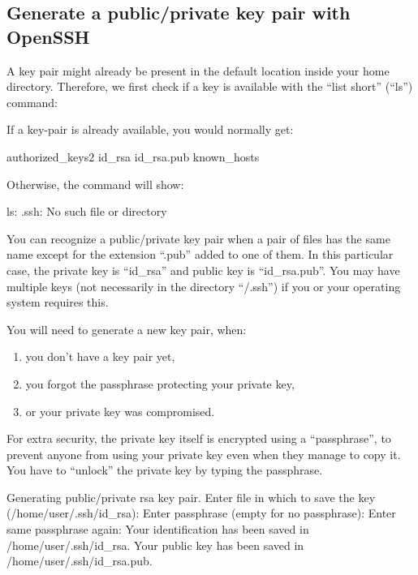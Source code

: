   \subsection{Generate a public/private key pair with OpenSSH}
  \label{sec:generate-key-pair-with-openssh}

  A key pair might already be present in the default location inside your home
  directory. Therefore, we first check if a key is available with the ``list
  short'' (``ls'')  command:

\begin{prompt}
\end{prompt}


  If a key-pair is already available, you would normally get:
\begin{prompt}
authorized_keys2    id_rsa            id_rsa.pub         known_hosts
\end{prompt}

  Otherwise, the command will show:

\begin{prompt}
ls: .ssh: No such file or directory
\end{prompt}

  You can recognize a public/private key pair when a pair of files has the same
  name except for the extension ``.pub'' added to one of them. In this particular
  case, the private key is ``id\_rsa'' and public key is ``id\_rsa.pub''. You may
  have multiple keys (not necessarily in the directory ``\tilde/.ssh'') if you or
  your operating system requires this.

  You will need to generate a new key pair, when:
  \begin{enumerate}
    \item  you don't have a key pair yet,
    \item  you forgot the passphrase protecting your private key,
    \item  or your private key was compromised.
  \end{enumerate}

  For extra security, the private key itself is encrypted using a ``passphrase'',
  to prevent anyone from using your private key even when they manage to copy
  it. You have to ``unlock'' the private key by typing the passphrase.

\begin{prompt}
Generating public/private rsa key pair.
Enter file in which to save the key (/home/user/.ssh/id_rsa):
Enter passphrase (empty for no passphrase):
Enter same passphrase again:
Your identification has been saved in /home/user/.ssh/id_rsa.
Your public key has been saved in /home/user/.ssh/id_rsa.pub.
\end{prompt}

